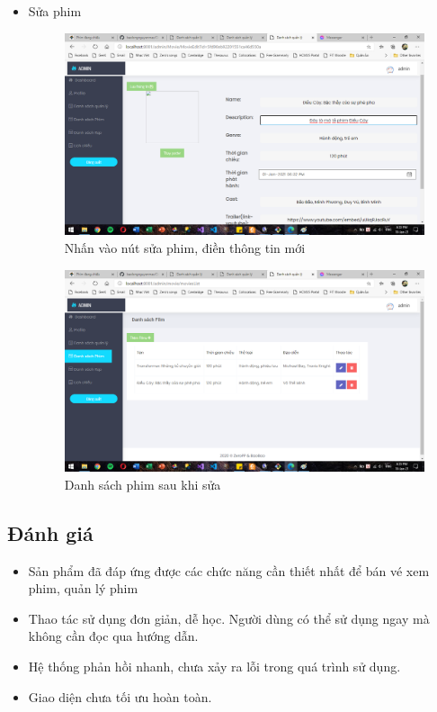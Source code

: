 \documentclass[a4paper, 12pt]{article}
\begin{document}
\begin{itemize}
\begin{itemize}
		\item Sửa phim
			\begin{figure}[H]
				\begin{center}
					\includegraphics[scale=0.5]{./image/demo_managerEditMovie1.png}
					\caption{Nhấn vào nút sửa phim, điền thông tin mới}
				\end{center}
			\end{figure}
	
			\begin{figure}[H]
				\begin{center}
					\includegraphics[scale=0.5]{./image/demo_managerEditMovie2.png}
					\caption{Danh sách phim sau khi sửa }
				\end{center}
			\end{figure}
	\end{itemize}


\end{itemize}



\subsection{Đánh giá}
\begin{itemize}
	\item Sản phẩm đã đáp ứng được các chức năng cần thiết nhất để bán vé xem phim, quản lý phim
	\item Thao tác sử dụng đơn giản, dễ học. Người dùng có thể sử dụng ngay mà không cần đọc qua hướng dẫn.
	\item Hệ thống phản hồi nhanh, chưa xảy ra lỗi trong quá trình sử dụng.
	\item Giao diện chưa tối ưu hoàn toàn.

\end{itemize}
\end{document}

